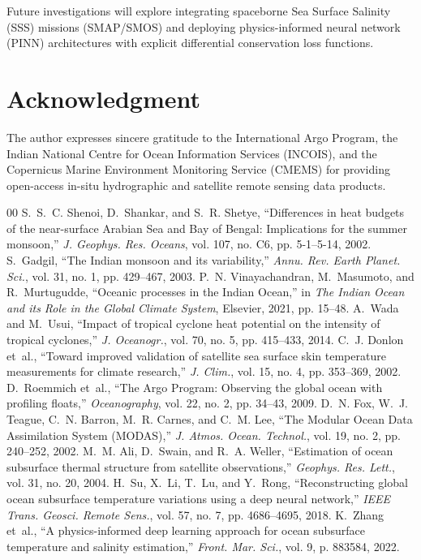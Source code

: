 \documentclass[conference]{IEEEtran}
\begin{document}
Future investigations will explore integrating spaceborne Sea Surface Salinity (SSS) missions (SMAP/SMOS) and deploying physics-informed neural network (PINN) architectures with explicit differential conservation loss functions.

\section*{Acknowledgment}
The author expresses sincere gratitude to the International Argo Program, the Indian National Centre for Ocean Information Services (INCOIS), and the Copernicus Marine Environment Monitoring Service (CMEMS) for providing open-access in-situ hydrographic and satellite remote sensing data products.

\begin{thebibliography}{00}
 S.~S.~C. Shenoi, D.~Shankar, and S.~R. Shetye, ``Differences in heat budgets of the near-surface Arabian Sea and Bay of Bengal: Implications for the summer monsoon,'' \textit{J. Geophys. Res. Oceans}, vol. 107, no. C6, pp. 5-1--5-14, 2002.
 S.~Gadgil, ``The Indian monsoon and its variability,'' \textit{Annu. Rev. Earth Planet. Sci.}, vol. 31, no. 1, pp. 429--467, 2003.
 P.~N. Vinayachandran, M.~Masumoto, and R.~Murtugudde, ``Oceanic processes in the Indian Ocean,'' in \textit{The Indian Ocean and its Role in the Global Climate System}, Elsevier, 2021, pp. 15--48.
 A.~Wada and M.~Usui, ``Impact of tropical cyclone heat potential on the intensity of tropical cyclones,'' \textit{J. Oceanogr.}, vol. 70, no. 5, pp. 415--433, 2014.
 C.~J. Donlon et~al., ``Toward improved validation of satellite sea surface skin temperature measurements for climate research,'' \textit{J. Clim.}, vol. 15, no. 4, pp. 353--369, 2002.
 D.~Roemmich et~al., ``The Argo Program: Observing the global ocean with profiling floats,'' \textit{Oceanography}, vol. 22, no. 2, pp. 34--43, 2009.
 D.~N. Fox, W.~J. Teague, C.~N. Barron, M.~R. Carnes, and C.~M. Lee, ``The Modular Ocean Data Assimilation System (MODAS),'' \textit{J. Atmos. Ocean. Technol.}, vol. 19, no. 2, pp. 240--252, 2002.
 M.~M. Ali, D.~Swain, and R.~A. Weller, ``Estimation of ocean subsurface thermal structure from satellite observations,'' \textit{Geophys. Res. Lett.}, vol. 31, no. 20, 2004.
 H.~Su, X.~Li, T.~Lu, and Y.~Rong, ``Reconstructing global ocean subsurface temperature variations using a deep neural network,'' \textit{IEEE Trans. Geosci. Remote Sens.}, vol. 57, no. 7, pp. 4686--4695, 2018.
 K.~Zhang et~al., ``A physics-informed deep learning approach for ocean subsurface temperature and salinity estimation,'' \textit{Front. Mar. Sci.}, vol. 9, p. 883584, 2022.
\end{thebibliography}
\end{document}
